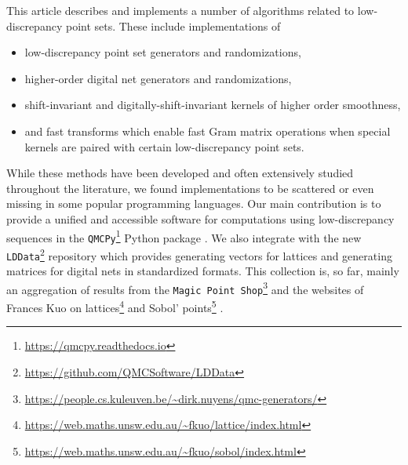 \documentclass[acmsmall]{acmart}
\begin{document}
This article describes and implements a number of algorithms related to low-discrepancy point sets. These include implementations of
\begin{itemize}
    \item low-discrepancy point set generators and randomizations,
    \item higher-order digital net generators and randomizations, 
    \item shift-invariant and digitally-shift-invariant kernels of higher order smoothness,
    \item and fast transforms which enable fast Gram matrix operations when special kernels are paired with certain low-discrepancy point sets. 
\end{itemize}
While these methods have been developed and often extensively studied throughout the literature, we found implementations to be scattered or even missing in some popular programming languages. Our main contribution is to provide a unified and accessible software for computations using low-discrepancy sequences in the \texttt{QMCPy}\footnote{\url{https://qmcpy.readthedocs.io}} Python package \citep{choi.QMC_software,choi.challenges_great_qmc_software}.  We also integrate with the new \texttt{LDData}\footnote{\url{https://github.com/QMCSoftware/LDData}} repository which provides generating vectors for lattices and generating matrices for digital nets in standardized formats. This collection is, so far, mainly an aggregation of results from the \texttt{Magic Point Shop}\footnote{\url{https://people.cs.kuleuven.be/~dirk.nuyens/qmc-generators/}} \citep{MPS} and the websites of Frances Kuo on lattices\footnote{\url{https://web.maths.unsw.edu.au/~fkuo/lattice/index.html}} \citep{cools2006constructing,nuyens2006fast} and Sobol' points\footnote{\url{https://web.maths.unsw.edu.au/~fkuo/sobol/index.html}} \citep{joe2003remark,joe2008constructing}.
\end{document}
